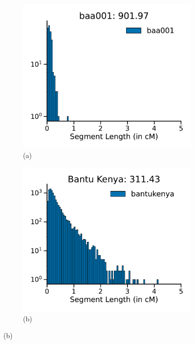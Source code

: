 \begin{figure}[htbp]
    \captionsetup{labelformat=empty} 
    \centering
    \begin{subfigure}[b]{0.4\textwidth}
        \includegraphics[width=\textwidth]{figures/gb_bta/segment_length/segment_lengths_histogram_baa001.pdf}
        \caption*{(a)}
    \end{subfigure}
    \hfill
    \begin{subfigure}[b]{0.4\textwidth}
        \includegraphics[width=\textwidth]{figures/gb_bta/segment_length/segment_lengths_histogram_bantukenya.pdf}
        \caption*{(b)}
    \end{subfigure}


\end{figure}
